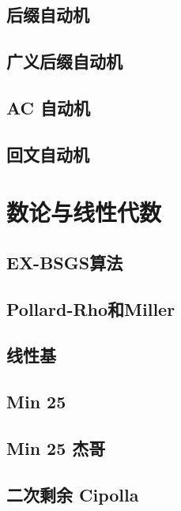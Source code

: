 \documentclass[a4paper,12pt]{article}
\begin{document}
\subsection{后缀自动机}

\subsection{广义后缀自动机}

\subsection{AC 自动机}

\subsection{回文自动机}


\section{数论与线性代数}

\subsection{EX-BSGS算法}

\subsection{Pollard-Rho和Miller}

\subsection{线性基}


\subsection{Min 25}

\subsection{Min 25 杰哥}

\subsection{二次剩余 Cipolla}

\end{document}
